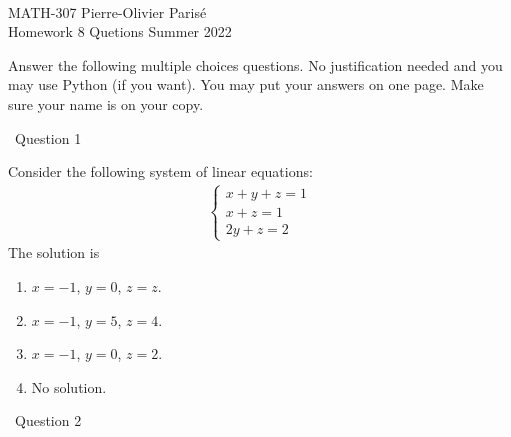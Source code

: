 \documentclass[12pt]{article}
\newcommand{\spc}{\vspace*{0.5cm}}
\newcommand{\ques}[1]{\noindent\hrulefill \, Question #1 \, \hrulefill}
\begin{document}
	\noindent \hrulefill \\
	MATH-307 \hfill Pierre-Olivier Paris{\'e}\\
	Homework 8 Quetions \hfill Summer 2022\\\vspace*{-0.7cm}
	
	\noindent\hrulefill
	
	\spc
	
	\spc
	
	Answer the following multiple choices questions. No justification needed and you may use Python (if you want). You may put your answers on one page. Make sure your name is on your copy.
	
	\spc
	
	\spc
	
	\ques{1}
	
	Consider the following system of linear equations:
		\begin{align*}
		\left\{
		\begin{matrix}
		x + y + z = 1 \\
		x + z = 1 \\
		2y + z = 2 
		\end{matrix} \right.
		\end{align*}
	The solution is
		\begin{multicols}{2}
		\begin{enumerate}[label=\alph*)]
		\item $x = -1$, $y = 0$, $z = z$.
		\item $x = -1$, $y = 5$, $z = 4$.
		\item $x = -1$, $y = 0$, $z = 2$.
		\item No solution.
		\end{enumerate}
		\end{multicols}
	
	\spc
	
	\ques{2}
	
\end{document}
